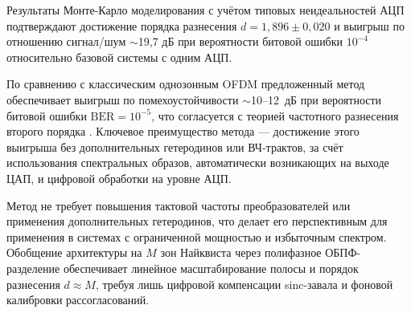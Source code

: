 \documentclass[a4paper,12pt]{article}
\numberwithin{equation}{section}
\begin{document}
Результаты Монте-Карло моделирования с учётом типовых неидеальностей АЦП подтверждают достижение порядка разнесения $d = 1{,}896 \pm 0{,}020$ и выигрыш по отношению сигнал/шум $\sim$19{,}7 дБ при вероятности битовой ошибки $10^{-4}$ относительно базовой системы с одним АЦП.

По сравнению с классическим однозонным OFDM предложенный метод обеспечивает 
выигрыш по помехоустойчивости $\sim$10--12~дБ при вероятности битовой ошибки 
$\text{BER}=10^{-5}$, что согласуется с теорией частотного разнесения второго 
порядка \cite{proakis}. Ключевое преимущество метода --- достижение этого 
выигрыша без дополнительных гетеродинов или ВЧ-трактов, за счёт использования 
спектральных образов, автоматически возникающих на выходе ЦАП, и цифровой 
обработки на уровне АЦП.

Метод не требует повышения тактовой частоты преобразователей или применения дополнительных гетеродинов, что делает его перспективным для применения в системах с ограниченной мощностью и избыточным спектром. Обобщение архитектуры на $M$ зон Найквиста через полифазное ОБПФ-разделение обеспечивает линейное масштабирование полосы и порядок разнесения $d \approx M$, требуя лишь цифровой компенсации sinc-завала и фоновой калибровки рассогласований.
\end{document}
